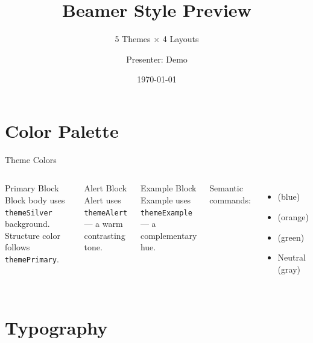 \documentclass[aspectratio=169,10pt]{beamer}
\title{Beamer Style Preview}
\subtitle{5 Themes × 4 Layouts}
\author{Presenter: Demo}
\institute{Shanghai Jiao Tong University}
\date{\today}
\begin{document}
\begin{frame}[plain]
  \titlepage
\end{frame}

\section{Color Palette}

\begin{frame}{Theme Colors}
  \begin{columns}[T]
    \begin{block}{Primary Block}
      Block body uses \texttt{themeSilver} background.
      Structure color follows \texttt{themePrimary}.
    \end{block}

    \begin{alertblock}{Alert Block}
      Alert uses \texttt{themeAlert} — a warm contrasting tone.
    \end{alertblock}

    \begin{exampleblock}{Example Block}
      Example uses \texttt{themeExample} — a complementary hue.
    \end{exampleblock}

    \vskip8pt
    Semantic commands:
    \begin{itemize}
      \item {} (blue)
      \item {} (orange)
      \item {} (green)
      \item \textcolor{neutral}{Neutral} (gray)
    \end{itemize}
  \end{columns}
\end{frame}

\section{Typography}
\end{document}
